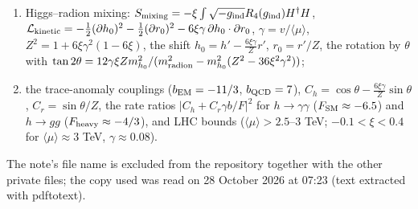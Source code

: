\documentclass[10pt,a4paper]{article}
\begin{document}
\begin{enumerate}
\item Higgs–radion mixing: $S_{\rm mixing}=-\xi\int\sqrt{-g_{\rm ind}}R_4(g_{\rm ind})H^\dagger H$, $\mathcal L_{\rm kinetic}=-\frac12(\partial h_0)^2-\frac12(\partial r_0)^2-6\xi\gamma\,\partial h_0\cdot\partial r_0$, $\gamma=v/\langle\mu\rangle$, $Z^2=1+6\xi\gamma^2(1-6\xi)$, the shift $h_0=h'-\frac{6\xi\gamma}Zr'$, $r_0=r'/Z$, the rotation by $\theta$ with $\tan2\theta=12\gamma\xi Zm_{h_0}^2/(m_{\rm radion}^2-m_{h_0}^2(Z^2-36\xi^2\gamma^2))$;
\item the trace-anomaly couplings ($b_{\rm EM}=-11/3$, $b_{\rm QCD}=7$), $C_h=\cos\theta-\frac{6\xi\gamma}Z\sin\theta$, $C_r=\sin\theta/Z$, the rate ratios $|C_h+C_r\gamma b/F|^2$ for $h\to\gamma\gamma$ ($F_{\rm SM}\approx-6.5$) and $h\to gg$ ($F_{\rm heavy}\approx-4/3$), and LHC bounds ($\langle\mu\rangle>2.5$–$3$ TeV; $-0.1<\xi<0.4$ for $\langle\mu\rangle\approx3$ TeV, $\gamma\approx0.08$).
\end{enumerate}
The note’s file name is excluded from the repository together with the other private files; the copy used was read on 28 October 2026 at 07:23 (text extracted with pdftotext).
\end{document}
